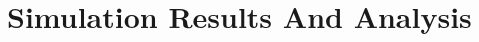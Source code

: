 \documentclass[draftclsnofoot,onecolumn,11pt]{IEEEtran}
\begin{document}
%




\section{Simulation Results And Analysis}
\end{document}
